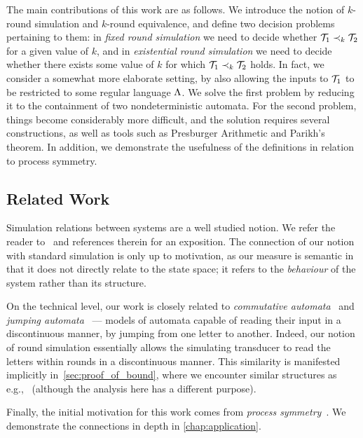 The main contributions of this work are as follows. We introduce the notion of $k$-round simulation and $k$-round equivalence, and define two decision problems pertaining to them: in \emph{fixed round simulation} we need to decide whether $\mathcal{T}_1\prec_k \mathcal{T}_2$ for a given value of $k$, and in \emph{existential round simulation} we need to decide whether there exists some value of $k$ for which $\mathcal{T}_1\prec_k \mathcal{T}_2$ holds. In fact, we consider a somewhat more elaborate setting, by also allowing the inputs to $\mathcal{T}_1$ to be restricted to some regular language $\Lambda$.
We solve the first problem by reducing it to the containment of two nondeterministic automata. For the second problem, things become considerably more difficult, and the solution requires several constructions, as well as tools such as Presburger Arithmetic and Parikh's theorem. 
In addition, we demonstrate the usefulness of the definitions in relation to process symmetry.

\subsection*{Related Work}
Simulation relations between systems are a well studied notion. We refer the reader to~\cite[Chapter 13]{Clarke2018a} and references therein for an exposition. The connection of our notion with standard simulation is only up to motivation, as our measure is semantic in that it does not directly relate to the state space; it refers to the \emph{behaviour} of the system rather than its structure.

On the technical level, our work is closely related to \emph{commutative automata}~\cite{Brzozowski1973} and \emph{jumping automata}~\cite{Fernau2015,Meduna2012} --- models of automata capable of reading their input in a discontinuous manner, by jumping from one letter to another. Indeed, our notion of round simulation essentially allows the simulating transducer to read the letters within rounds in a discontinuous manner. This similarity is manifested implicitly in~\autoref{sec:proof_of_bound}, where we encounter similar structures as e.g.,~\cite{Hoffmann2020} (although the analysis here has a different purpose).

Finally, the initial motivation for this work comes from \emph{process symmetry}~\cite{Almagor2020b,Clarke1996,Emerson1996,Ip1996,Lin2016}. We demonstrate the connections in depth in \autoref{chap:application}.

